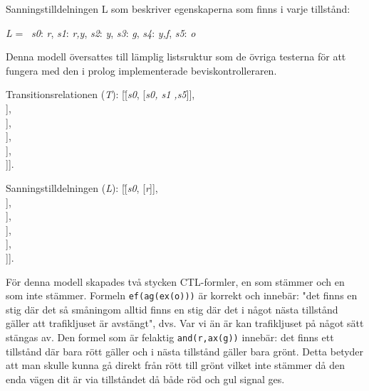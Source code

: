 Sanningstilldelningen L som beskriver egenskaperna som finns i varje tillstånd:
\begin{tabbing}
\textit{L} = \textbraceleft\
\textit{s0}:\textbraceleft
\textit{r}\textbraceright, 
\textit{s1}:\textbraceleft 
\textit{r,y}\textbraceright, 
\textit{s2}:\textbraceleft 
\textit{y}\textbraceright, 
\textit{s3}:\textbraceleft 
\textit{g}\textbraceright, 
\textit{s4}:\textbraceleft 
\textit{y,f}\textbraceright, 
\textit{s5}:\textbraceleft 
\textit{o}\textbraceright\ \textbraceright
\end{tabbing}

Denna modell översattes till lämplig listsruktur som de övriga testerna för att fungera med den i prolog implementerade beviskontrolleraren.
\begin{tabbing}
Transitionsrelationen (\textit{T}):
[\=[\textit{s0}, [\textit{s0, s1 ,s5}]],\\
\>[\textit{s1}, [\textit{s0, s3, s5}]],\\
\>[\textit{s2}, [\textit{s0, s1, s3, s5}]],\\
\>[\textit{s3}, [\textit{s3, s2, s5}]],\\
\>[\textit{s4}, [\textit{s4, s5}]],\\
\>[\textit{s5}, [\textit{s5, s0, s4, s5}]]].\\
\end{tabbing}

\begin{tabbing}
Sanningstilldelningen (\textit{L}):
[\=[\textit{s0}, [\textit{r}]],\\
\>[\textit{s1}, [\textit{r,y}]],\\
\>[\textit{s2}, [\textit{y}]],\\
\>[\textit{s3}, [\textit{g}]],\\
\>[\textit{s4}, [\textit{y,f}]],\\
\>[\textit{s5}, [\textit{o}]]].\\
\end{tabbing}
\clearpage

För denna modell skapades två stycken CTL-formler, en som stämmer och en som inte stämmer.
Formeln \texttt{ef(ag(ex(o)))} är korrekt och innebär: "det finns en stig där det så småningom alltid finns en stig där det i något nästa tillstånd gäller att trafikljuset är avstängt", dvs. Var vi än är kan trafikljuset på något sätt stängas av. Den formel som är felaktig \texttt{and(r,ax(g))} innebär: det finns ett tillstånd där bara rött gäller och i nästa tillstånd gäller bara grönt. Detta betyder att man skulle kunna gå direkt från rött till grönt vilket inte stämmer då den enda vägen dit är via tillståndet då både röd och gul signal ges.